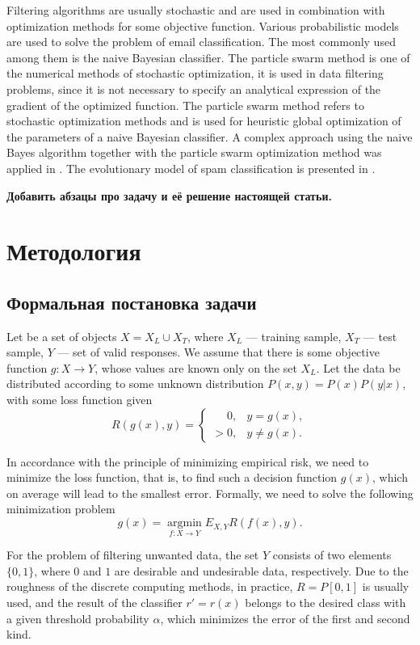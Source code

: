 \documentclass[12pt]{article}
\begin{document}
Filtering algorithms are usually stochastic \cite{Garg2021}
and are used in combination with optimization methods for some objective function.
Various probabilistic models are used to solve the problem of email classification. The most commonly used among them is the naive Bayesian classifier. The particle swarm method is one of the numerical methods of stochastic optimization, it is used in data filtering problems, since it is not necessary to specify an analytical expression of the gradient of the optimized function.
The particle swarm method refers to stochastic optimization methods and is used for heuristic global optimization of the parameters of a naive Bayesian classifier. A complex approach using the naive Bayes algorithm together with the particle swarm optimization method was applied in \cite{Parmar2020}.
The evolutionary model of spam classification is presented in \cite{Mohammad2020}.

{
\bf\color{amaranth}
Добавить абзацы про задачу и её решение настоящей статьи.
}



\section{Методология}
\subsection{Формальная постановка задачи}
Let be a set of objects $ X = X_L \cup X_T$, where
$X_L$ --- training sample,
$X_T$ --- test sample,
$Y$ --- set of valid responses. We assume that there is some objective function $g: X \rightarrow Y$, whose values are known only on the set $X_L$. Let the data be distributed according to some unknown distribution $P (x,y) = P(x) P (y|x)$, with some loss function given
$$
R(g(x), y) = 
\begin{cases} 
\phantom{>}0, & y = g(x), \\
> 0, & y \neq g(x).
\end{cases}
$$

In accordance with the principle of minimizing empirical risk, we need to minimize the loss function, that is, to find such a decision function $g(x)$, which on average will lead to the smallest error. Formally, we need to solve the following minimization problem
$$
g(x) = \operatorname*{argmin}_{f: X \rightarrow Y} E_{X,Y} R(f(x), y).
$$

For the problem of filtering unwanted data, the set $Y$ consists of two elements $\{0, 1\}$, where $0$ and $1$ are desirable and undesirable data, respectively. Due to the roughness of the discrete computing methods, in practice, $R = P[0, 1]$ is usually used, and the result of the classifier $r' = r(x)$ belongs to the desired class with a given threshold probability $\alpha$, which minimizes the error of the first and second kind.
\end{document}
